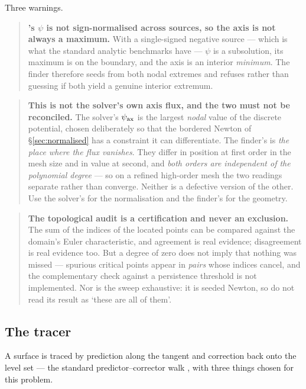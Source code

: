 Three warnings.

\begin{quote}
	\textbf{{\meq}'s $\psi$ is not sign-normalised across sources, so the axis is
	not always a maximum.} With a single-signed negative source --- which is what
	the standard analytic benchmarks have --- $\psi$ is a subsolution, its
	maximum is on the boundary, and the axis is an interior \emph{minimum}. The
	finder therefore seeds from both nodal extremes and refuses rather than
	guessing if both yield a genuine interior extremum.
\end{quote}

\begin{quote}
	\textbf{This is not the solver's own axis flux, and the two must not be
	reconciled.} The solver's $\psi_{\mathrm{ax}}$ is the largest \emph{nodal} value of the
	discrete potential, chosen deliberately so that the bordered Newton of
	\S\ref{sec:normalised} has a constraint it can differentiate. The finder's is \emph{the place
	where the flux vanishes}. They differ in position at first order in the mesh
	size and in value at second, and \emph{both orders are independent of the
	polynomial degree} --- so on a refined high-order mesh the two readings
	separate rather than converge. Neither is a defective version of the other.
	Use the solver's for the normalisation and the finder's for the geometry.
\end{quote}

\begin{quote}
	\textbf{The topological audit is a certification and never an exclusion.} The
	sum of the indices of the located points can be compared against the domain's
	Euler characteristic, and agreement is real evidence; disagreement is real
	evidence too. But a degree of zero does not imply that nothing was missed ---
	spurious critical points appear in \emph{pairs} whose indices cancel, and the
	complementary check against a persistence threshold is not implemented. Nor
	is the sweep exhaustive: it is seeded Newton, so do not read its result as
	`these are all of them'.
\end{quote}

\subsection{The tracer}

A surface is traced by prediction along the tangent and correction back onto the
level set --- the standard predictor--corrector walk \cite{AllgowerGeorg2003},
with three things chosen for this problem.

